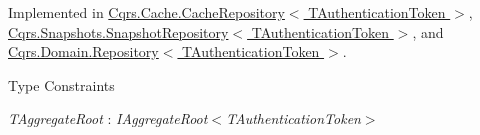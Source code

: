 Implemented in \hyperlink{classCqrs_1_1Cache_1_1CacheRepository_a1c4bbe08b2a21523a4871d9a2f484ee6_a1c4bbe08b2a21523a4871d9a2f484ee6}{Cqrs.\+Cache.\+Cache\+Repository$<$ T\+Authentication\+Token $>$}, \hyperlink{classCqrs_1_1Snapshots_1_1SnapshotRepository_a4a7484e7754cae876f0c04e640eb80ff_a4a7484e7754cae876f0c04e640eb80ff}{Cqrs.\+Snapshots.\+Snapshot\+Repository$<$ T\+Authentication\+Token $>$}, and \hyperlink{classCqrs_1_1Domain_1_1Repository_a7795a0bd435022c686306fbc76311694_a7795a0bd435022c686306fbc76311694}{Cqrs.\+Domain.\+Repository$<$ T\+Authentication\+Token $>$}.

\begin{Desc}
\item[Type Constraints]\begin{description}
\item[{\em T\+Aggregate\+Root} : {\em I\+Aggregate\+Root$<$T\+Authentication\+Token$>$}]\end{description}
\end{Desc}
